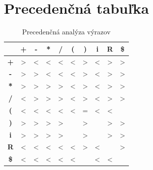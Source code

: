 \documentclass [11pt, a4paper]{article}
\begin{document}
\section{Precedenčná tabuľka}
\begin{table}[H]
\centering
\begin{tabular}{|c|c|c|c|c|c|c|c|c|c|}
\hline
   & \textbf{+} & \textbf{\--}  & \textbf{*} & \textbf{/} & \textbf{(} & \textbf{)} & \textbf{i}  & \textbf{R} & \textbf{\$} \\ \hline
\textbf{+}  & \textgreater{} & \textless{}    & \textless{}    & \textless{}    & \textless{} & \textgreater{} & \textless{} & \textgreater{} & \textgreater{} \\ \hline
\textbf{\--}  & \textgreater{} & \textgreater{} & \textless{}    & \textless{}    & \textless{} & \textgreater{} & \textless{} & \textgreater{} & \textgreater{} \\ \hline
\textbf{*}  & \textgreater{} & \textgreater{} & \textgreater{} & \textgreater{} & \textless{} & \textgreater{} & \textless{} & \textgreater{} & \textgreater{} \\ \hline
\textbf{/}  & \textless{}    & \textgreater{} & \textgreater{} & \textgreater{} & \textless{} & \textgreater{} & \textless{} & \textgreater{} & \textgreater{} \\ \hline
\textbf{(}  & \textless{}    & \textless{}    & \textless{}    & \textless{}    & \textless{} & =              & \textless{} & \textless{}    &                \\ \hline
\textbf{)}  & \textgreater{} & \textgreater{} & \textgreater{} & \textgreater{} &             & \textgreater{} &             & \textgreater{} & \textgreater{} \\ \hline
\textbf{i}  & \textgreater{} & \textgreater{} & \textgreater{} & \textgreater{} &             & \textgreater{} &             & \textgreater{} & \textgreater{} \\ \hline
\textbf{R}  & \textless{}    & \textless{}    & \textless{}    & \textless{}    & \textless{} & \textgreater{} & \textless{} &                & \textgreater{} \\ \hline
\textbf{\$} & \textless{}    & \textless{}    & \textless{}    & \textless{}    & \textless{} &                & \textless{} & \textless{}    &                \\ \hline
\end{tabular}
\caption{Precedenčná analýza výrazov}
\end{table}
\end{document}
